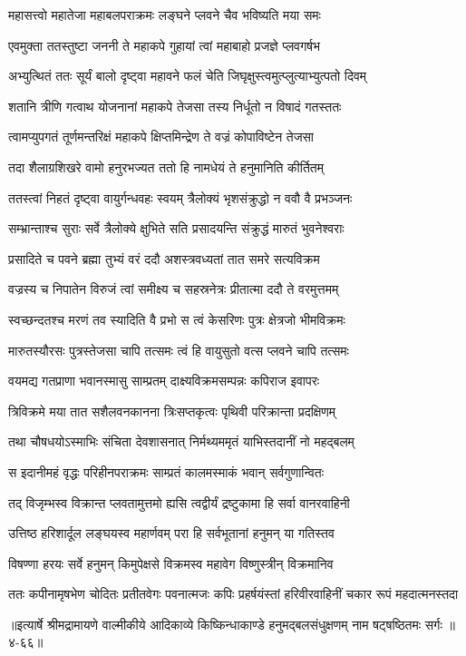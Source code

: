 \twolineshloka
{महासत्त्वो महातेजा महाबलपराक्रमः}
{लङ्घने प्लवने चैव भविष्यति मया समः} %

\twolineshloka
{एवमुक्ता ततस्तुष्टा जननी ते महाकपे}
{गुहायां त्वां महाबाहो प्रजज्ञे प्लवगर्षभ} %

\twolineshloka
{अभ्युत्थितं ततः सूर्यं बालो दृष्ट्वा महावने}
{फलं चेति जिघृक्षुस्त्वमुत्प्लुत्याभ्युत्पतो दिवम्} %

\twolineshloka
{शतानि त्रीणि गत्वाथ योजनानां महाकपे}
{तेजसा तस्य निर्धूतो न विषादं गतस्ततः} %

\twolineshloka
{त्वामप्युपगतं तूर्णमन्तरिक्षं महाकपे}
{क्षिप्तमिन्द्रेण ते वज्रं कोपाविष्टेन तेजसा} %

\twolineshloka
{तदा शैलाग्रशिखरे वामो हनुरभज्यत}
{ततो हि नामधेयं ते हनुमानिति कीर्तितम्} %

\twolineshloka
{ततस्त्वां निहतं दृष्ट्वा वायुर्गन्धवहः स्वयम्}
{त्रैलोक्यं भृशसंक्रुद्धो न ववौ वै प्रभञ्जनः} %

\twolineshloka
{सम्भ्रान्ताश्च सुराः सर्वे त्रैलोक्ये क्षुभिते सति}
{प्रसादयन्ति संक्रुद्धं मारुतं भुवनेश्वराः} %

\twolineshloka
{प्रसादिते च पवने ब्रह्मा तुभ्यं वरं ददौ}
{अशस्त्रवध्यतां तात समरे सत्यविक्रम} %

\twolineshloka
{वज्रस्य च निपातेन विरुजं त्वां समीक्ष्य च}
{सहस्रनेत्रः प्रीतात्मा ददौ ते वरमुत्तमम्} %

\twolineshloka
{स्वच्छन्दतश्च मरणं तव स्यादिति वै प्रभो}
{स त्वं केसरिणः पुत्रः क्षेत्रजो भीमविक्रमः} %

\twolineshloka
{मारुतस्यौरसः पुत्रस्तेजसा चापि तत्समः}
{त्वं हि वायुसुतो वत्स प्लवने चापि तत्समः} %

\twolineshloka
{वयमद्य गतप्राणा भवानस्मासु साम्प्रतम्}
{दाक्ष्यविक्रमसम्पन्नः कपिराज इवापरः} %

\twolineshloka
{त्रिविक्रमे मया तात सशैलवनकानना}
{त्रिःसप्तकृत्वः पृथिवी परिक्रान्ता प्रदक्षिणम्} %

\twolineshloka
{तथा चौषधयोऽस्माभिः संचिता देवशासनात्}
{निर्मथ्यममृतं याभिस्तदानीं नो महद्बलम्} %

\twolineshloka
{स इदानीमहं वृद्धः परिहीनपराक्रमः}
{साम्प्रतं कालमस्माकं भवान् सर्वगुणान्वितः} %

\twolineshloka
{तद् विजृम्भस्व विक्रान्त प्लवतामुत्तमो ह्यसि}
{त्वद्वीर्यं द्रष्टुकामा हि सर्वा वानरवाहिनी} %

\twolineshloka
{उत्तिष्ठ हरिशार्दूल लङ्घयस्व महार्णवम्}
{परा हि सर्वभूतानां हनुमन् या गतिस्तव} %

\twolineshloka
{विषण्णा हरयः सर्वे हनुमन् किमुपेक्षसे}
{विक्रमस्व महावेग विष्णुस्त्रीन् विक्रमानिव} %

\twolineshloka
{ततः कपीनामृषभेण चोदितः प्रतीतवेगः पवनात्मजः कपिः}
{प्रहर्षयंस्तां हरिवीरवाहिनीं चकार रूपं महदात्मनस्तदा} %


॥इत्यार्षे श्रीमद्रामायणे वाल्मीकीये आदिकाव्ये किष्किन्धाकाण्डे हनुमद्बलसंधुक्षणम् नाम षट्षष्ठितमः सर्गः ॥४-६६॥
